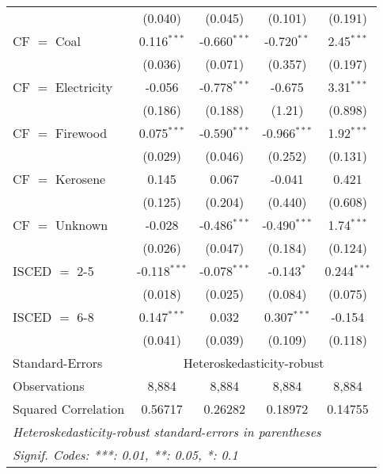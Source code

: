 \begin{table}[htbp!]
\begin{adjustbox}{width = 1\textwidth, max height = 0.95\textheight, center}
\begin{threeparttable}[b]
\begin{tabular}{lcccc}
                                 & (0.040)            & (0.045)            & (0.101)        & (0.191)\\   
            CF $=$ Coal          & 0.116$^{***}$      & -0.660$^{***}$     & -0.720$^{**}$  & 2.45$^{***}$\\   
                                 & (0.036)            & (0.071)            & (0.357)        & (0.197)\\   
            CF $=$ Electricity   & -0.056             & -0.778$^{***}$     & -0.675         & 3.31$^{***}$\\   
                                 & (0.186)            & (0.188)            & (1.21)         & (0.898)\\   
            CF $=$ Firewood      & 0.075$^{***}$      & -0.590$^{***}$     & -0.966$^{***}$ & 1.92$^{***}$\\   
                                 & (0.029)            & (0.046)            & (0.252)        & (0.131)\\   
            CF $=$ Kerosene      & 0.145              & 0.067              & -0.041         & 0.421\\   
                                 & (0.125)            & (0.204)            & (0.440)        & (0.608)\\   
            CF $=$ Unknown       & -0.028             & -0.486$^{***}$     & -0.490$^{***}$ & 1.74$^{***}$\\   
                                 & (0.026)            & (0.047)            & (0.184)        & (0.124)\\   
            ISCED $=$ 2-5        & -0.118$^{***}$     & -0.078$^{***}$     & -0.143$^{*}$   & 0.244$^{***}$\\   
                                 & (0.018)            & (0.025)            & (0.084)        & (0.075)\\   
            ISCED $=$ 6-8        & 0.147$^{***}$      & 0.032              & 0.307$^{***}$  & -0.154\\   
                                 & (0.041)            & (0.039)            & (0.109)        & (0.118)\\   
            \midrule 
            Standard-Errors & \multicolumn{4}{c}{Heteroskedasticity-robust} \\ 
            Observations         & 8,884              & 8,884              & 8,884          & 8,884\\  
            Squared Correlation  & 0.56717            & 0.26282            & 0.18972        & 0.14755\\  
            \midrule \midrule
            \multicolumn{5}{l}{\emph{Heteroskedasticity-robust standard-errors in parentheses}}\\
            \multicolumn{5}{l}{\emph{Signif. Codes: ***: 0.01, **: 0.05, *: 0.1}}\\
         \end{tabular}
         

\end{threeparttable}
\end{adjustbox}
\end{table}
